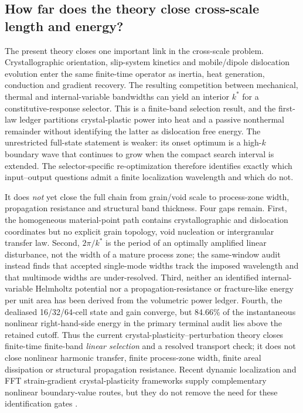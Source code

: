 \subsection{How far does the theory close cross-scale length and energy?}

The present theory closes one important link in the cross-scale problem. Crystallographic orientation, slip-system kinetics and mobile/dipole dislocation evolution enter the same finite-time operator as inertia, heat generation, conduction and gradient recovery. The resulting competition between mechanical, thermal and internal-variable bandwidths can yield an interior $k^*$ for a constitutive-response selector. This is a finite-band selection result, and the first-law ledger partitions crystal-plastic power into heat and a passive nonthermal remainder without identifying the latter as dislocation free energy. The unrestricted full-state statement is weaker: its onset optimum is a high-$k$ boundary wave that continues to grow when the compact search interval is extended. The selector-specific re-optimization therefore identifies exactly which input--output questions admit a finite localization wavelength and which do not.

It does \emph{not} yet close the full chain from grain/void scale to process-zone width, propagation resistance and structural band thickness. Four gaps remain. First, the homogeneous material-point path contains crystallographic and dislocation coordinates but no explicit grain topology, void nucleation or intergranular transfer law. Second, $2\pi/k^*$ is the period of an optimally amplified linear disturbance, not the width of a mature process zone; the same-window audit instead finds that accepted single-mode widths track the imposed wavelength and that multimode widths are under-resolved. Third, neither an identified internal-variable Helmholtz potential nor a propagation-resistance or fracture-like energy per unit area has been derived from the volumetric power ledger. Fourth, the dealiased 16/32/64-cell state and gain converge, but 84.66\% of the instantaneous nonlinear right-hand-side energy in the primary terminal audit lies above the retained cutoff. Thus the current crystal-plasticity--perturbation theory closes finite-time finite-band \emph{linear selection} and a resolved transport check; it does not close nonlinear harmonic transfer, finite process-zone width, finite areal dissipation or structural propagation resistance. Recent dynamic localization and FFT strain-gradient crystal-plasticity frameworks supply complementary nonlinear boundary-value routes, but they do not remove the need for these identification gates \cite{MouradEtAl2017,LameJouybariEtAl2024}.

